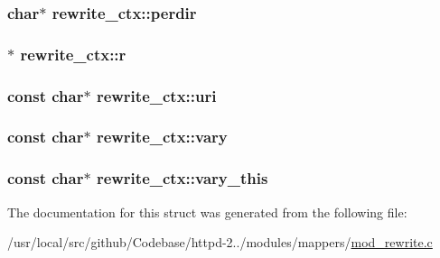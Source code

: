 \subsubsection[{\texorpdfstring{perdir}{perdir}}]{\setlength{\rightskip}{0pt plus 5cm}char$\ast$ rewrite\+\_\+ctx\+::perdir}\hypertarget{structrewrite__ctx_a8c84980ee7236c051691ce566ca3ef57}{}\label{structrewrite__ctx_a8c84980ee7236c051691ce566ca3ef57}
\subsubsection[{\texorpdfstring{r}{r}}]{$\ast$ rewrite\+\_\+ctx\+::r}\hypertarget{structrewrite__ctx_a083ee94e1209fa4ad3174fbaa2048844}{}\label{structrewrite__ctx_a083ee94e1209fa4ad3174fbaa2048844}
\subsubsection[{\texorpdfstring{uri}{uri}}]{\setlength{\rightskip}{0pt plus 5cm}const char$\ast$ rewrite\+\_\+ctx\+::uri}\hypertarget{structrewrite__ctx_a57d2ee96d2c5b7b66d5d60a39b3484ca}{}\label{structrewrite__ctx_a57d2ee96d2c5b7b66d5d60a39b3484ca}
\subsubsection[{\texorpdfstring{vary}{vary}}]{\setlength{\rightskip}{0pt plus 5cm}const char$\ast$ rewrite\+\_\+ctx\+::vary}\hypertarget{structrewrite__ctx_a4c0833e92885cce4265ef1fdbdfec05b}{}\label{structrewrite__ctx_a4c0833e92885cce4265ef1fdbdfec05b}
\subsubsection[{\texorpdfstring{vary\+\_\+this}{vary_this}}]{\setlength{\rightskip}{0pt plus 5cm}const char$\ast$ rewrite\+\_\+ctx\+::vary\+\_\+this}\hypertarget{structrewrite__ctx_a1b56fab34d46af2c6610e5922253dcbc}{}\label{structrewrite__ctx_a1b56fab34d46af2c6610e5922253dcbc}


The documentation for this struct was generated from the following file\+:\begin{DoxyCompactItemize}
\item 
/usr/local/src/github/\+Codebase/httpd-\/2../modules/mappers/\hyperlink{mod__rewrite_8c}{mod\+\_\+rewrite.\+c}\end{DoxyCompactItemize}
